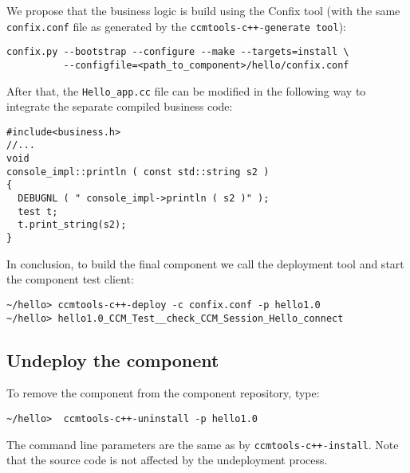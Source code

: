 \noindent
We propose that the business logic is build using the Confix tool (with the
same {\tt confix.conf} file as generated by the {\tt ccmtools-c++-generate tool}):
\begin{verbatim}
confix.py --bootstrap --configure --make --targets=install \
          --configfile=<path_to_component>/hello/confix.conf
\end{verbatim}

\noindent
After that, the {\tt Hello\_app.cc} file can be modified in the following way
to integrate the separate compiled business code:
\begin{verbatim}
#include<business.h>
//...
void
console_impl::println ( const std::string s2 )
{
  DEBUGNL ( " console_impl->println ( s2 )" );
  test t;
  t.print_string(s2);
}
\end{verbatim}

\noindent
In conclusion, to build the final component we call the deployment tool and start the
component test client:
\begin{verbatim}
~/hello> ccmtools-c++-deploy -c confix.conf -p hello1.0
~/hello> hello1.0_CCM_Test__check_CCM_Session_Hello_connect
\end{verbatim}



\subsection{Undeploy the component}

To remove the component from the component repository, type:
\begin{verbatim}
~/hello>  ccmtools-c++-uninstall -p hello1.0
\end{verbatim}
The command line parameters are the same as by {\tt ccmtools-c++-install}.
Note that the source code is not affected by the undeployment process.





